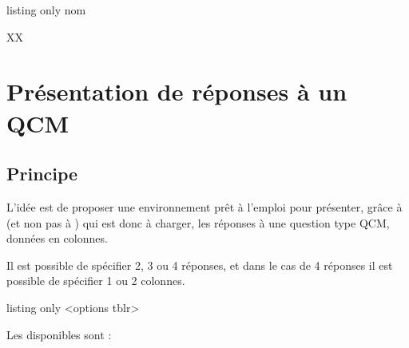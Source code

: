 \documentclass[french,11pt,a4paper]{article}
\begin{document}
\begin{DemoCode}{listing only}
%
  {nom}
\end{DemoCode}

\begin{DemoCode}{}
{\Huge XX}
\end{DemoCode}

\begin{DemoCode}{}
\end{DemoCode}

\newpage

\section{Présentation de réponses à un QCM}

\subsection{Principe}

L'idée est de proposer une environnement prêt à l'emploi pour présenter, grâce à  (et non pas à ) qui est donc à charger, les réponses à une question type QCM, données en colonnes.

\smallskip

Il est possible de spécifier 2, 3 ou 4 réponses, et dans le cas de 4 réponses il est possible de spécifier 1 ou 2 colonnes.

\begin{DemoCode}{listing only}
<options tblr>
\end{DemoCode}

Les  disponibles sont :
\end{document}

